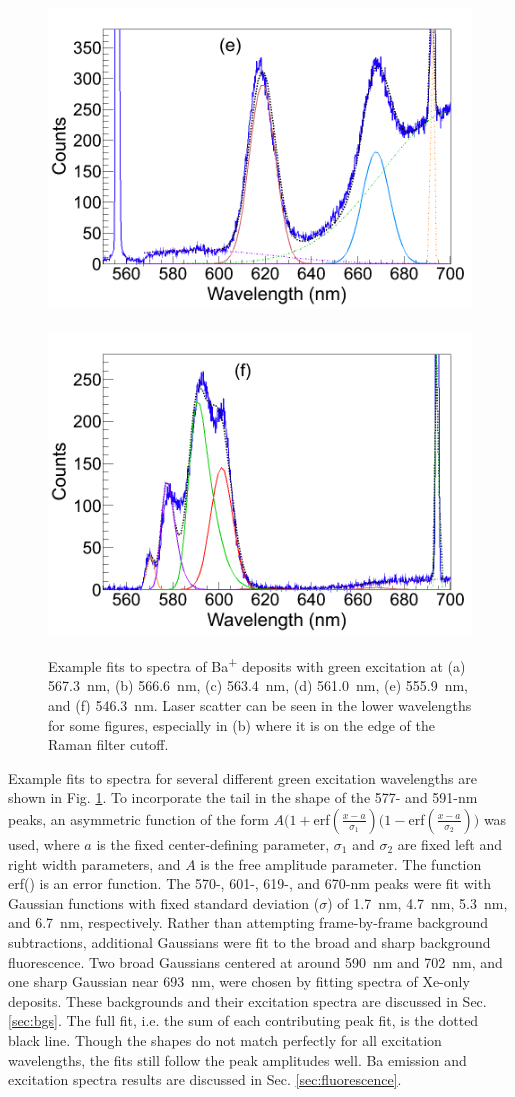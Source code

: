 \begin{figure}
                \includegraphics[width=.5\textwidth]{figures/spectra_fit_e.png}
                ~
                \includegraphics[width=.5\textwidth]{figures/spectra_fit_f.png}
                \caption{Example fits to spectra of Ba\textsuperscript{+} deposits with green excitation at (a) 567.3~nm, (b) 566.6~nm, (c) 563.4~nm, (d) 561.0~nm, (e) 555.9~nm, and (f) 546.3~nm.  Laser scatter can be seen in the lower wavelengths for some figures, especially in (b) where it is on the edge of the Raman filter cutoff.}
\label{fig:specFitsGrn}
\end{figure}

Example fits to spectra for several different green excitation wavelengths are shown in Fig. \ref{fig:specFitsGrn}.  To incorporate the tail in the shape of the 577- and 591-nm peaks, an asymmetric function of the form $A(1+$erf$(\frac{x-a}{\sigma_{1}})(1-$erf$(\frac{x-a}{\sigma_{2}}))$ was used, where $a$ is the fixed center-defining parameter, $\sigma_{1}$ and $\sigma_{2}$ are fixed left and right width parameters, and $A$ is the free amplitude parameter.  The function erf() is an error function.  The 570-, 601-, 619-, and 670-nm peaks were fit with Gaussian functions with fixed standard deviation ($\sigma$) of 1.7~nm, 4.7~nm, 5.3~nm, and 6.7~nm, respectively.  Rather than attempting frame-by-frame background subtractions, additional Gaussians were fit to the broad and sharp background fluorescence.  Two broad Gaussians centered at around 590~nm and 702~nm, and one sharp Gaussian near 693~nm, were chosen by fitting spectra of Xe-only deposits.  These backgrounds and their excitation spectra are discussed in Sec. \ref{sec:bgs}.  The full fit, i.e. the sum of each contributing peak fit, is the dotted black line.  Though the shapes do not match perfectly for all excitation wavelengths, the fits still follow the peak amplitudes well.  Ba emission and excitation spectra results are discussed in Sec. \ref{sec:fluorescence}.

